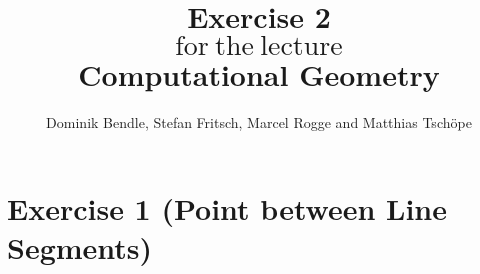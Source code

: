 \documentclass[english, fontsize=12pt, paper=a4, twoside=false, open=right, draft=true, pagesize=auto, version=last, DIV=16]{scrartcl}
\theoremstyle{break}
\begin{document}
\title{
\vspace*{-10mm}
Exercise 2 \\[-3pt]
{\Large $\mathrm{for \ the \ lecture}$} \\[-3pt]
{\LARGE \textbf{Computational Geometry}}
}
\author{Dominik Bendle, Stefan Fritsch, Marcel Rogge and Matthias Tschöpe}
\maketitle
\vspace*{-10mm}

\section*{Exercise 1 (Point between Line Segments)}
\newpage
\end{document}
